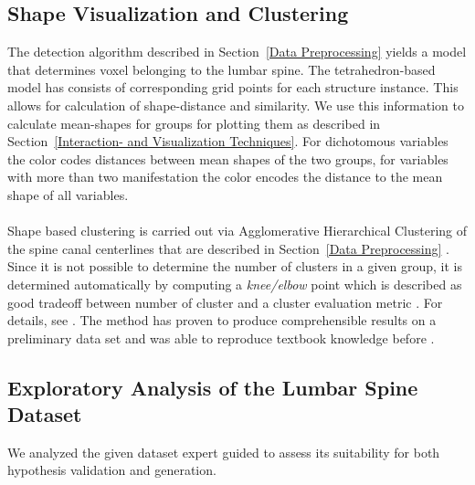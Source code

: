 \documentclass[journal]{style/vgtc} 			          %
\begin{document}
\subsection{Shape Visualization and Clustering}
The detection algorithm described in Section~\ref{Data Preprocessing} yields a model that determines voxel belonging to the lumbar spine.
%
The tetrahedron-based model has consists of corresponding grid points for each structure instance.
%
This allows for calculation of shape-distance and similarity.
%
We use this information to calculate mean-shapes for groups for plotting them as described in Section~\ref{Interaction- and Visualization Techniques}.
%
For dichotomous variables the color codes distances between mean shapes of the two groups, for variables with more than two manifestation the color encodes the distance to the mean shape of all variables.
\\\\
Shape based clustering is carried out via Agglomerative Hierarchical Clustering of the spine canal centerlines that are described in Section~\ref{Data Preprocessing} \cite{Klemm2013VMV}.
%
Since it is not possible to determine the number of clusters in a given group, it is determined automatically by computing a \emph{knee/elbow} point which is described as good tradeoff between number of cluster and a cluster evaluation metric \cite{Salvador2004}.
%
For details, see \cite{Klemm2013VMV}.
%
The method has proven to produce comprehensible results on a preliminary data set and was able to reproduce textbook knowledge before \cite{Klemm2013VMV}.

\subsection{Exploratory Analysis of the Lumbar Spine Dataset}
%
We analyzed the given dataset expert guided to assess its suitability for both hypothesis validation and generation.
%
\end{document}
